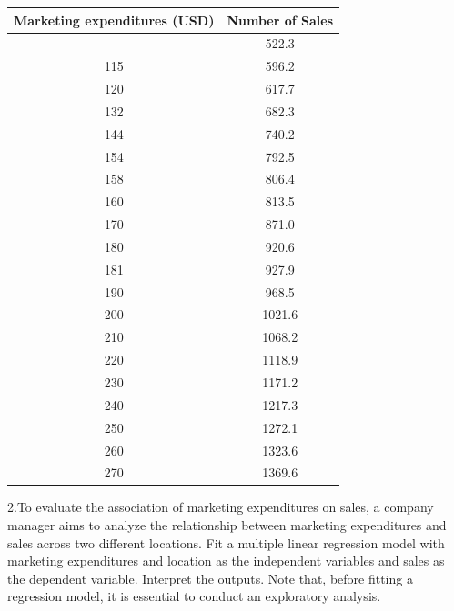\documentclass[
  letterpaper,
  DIV=11,
  numbers=noendperiod]{scrreprt}
\begin{document}
\begin{longtable}[]{@{}cc@{}}
\toprule\noalign{}
Marketing expenditures (USD) & Number of Sales \\
\midrule\noalign{}
\endhead
\bottomrule\noalign{}
\endlastfoot
100 & 522.3 \\
115 & 596.2 \\
120 & 617.7 \\
132 & 682.3 \\
144 & 740.2 \\
154 & 792.5 \\
158 & 806.4 \\
160 & 813.5 \\
170 & 871.0 \\
180 & 920.6 \\
181 & 927.9 \\
190 & 968.5 \\
200 & 1021.6 \\
210 & 1068.2 \\
220 & 1118.9 \\
230 & 1171.2 \\
240 & 1217.3 \\
250 & 1272.1 \\
260 & 1323.6 \\
270 & 1369.6 \\
\end{longtable}

2.To evaluate the association of marketing expenditures on sales, a
company manager aims to analyze the relationship between marketing
expenditures and sales across two different locations. Fit a multiple
linear regression model with marketing expenditures and location as the
independent variables and sales as the dependent variable. Interpret the
outputs. Note that, before fitting a regression model, it is essential
to conduct an exploratory analysis.
\end{document}
